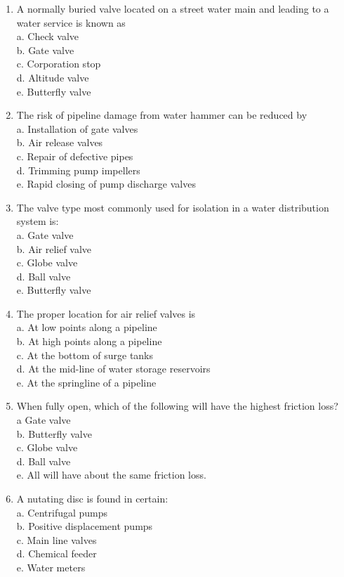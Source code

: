 \begin{enumerate}[1.]
\item A normally buried valve located on a street water main and leading to a water service is known as\\
a.	Check valve\\
b.	Gate valve \\
c.	Corporation stop\\
d.	Altitude valve\\
e.	Butterfly valve

\item The risk of pipeline damage from water hammer can be reduced by\\ 
a.	Installation of gate valves\\
b.	Air release valves\\
c.	Repair of defective pipes\\
d.	Trimming pump impellers\\
e.	Rapid closing of pump discharge valves

\item The valve type most commonly used for isolation in a water distribution system is:\\
a.	Gate valve\\
b.	Air relief valve\\
c.	Globe valve\\
d.	Ball valve\\
e.	Butterfly valve

\item The proper location for air relief valves is\\
a.	At low points along a pipeline\\
b.	At high points along a pipeline\\
c.	At the bottom of surge tanks\\
d.	At the mid-line of water storage reservoirs\\
e.	At the springline of a pipeline

\item When fully open, which of the following will have the highest friction loss?\\
a	Gate valve\\
b.	Butterfly valve\\
c.	Globe valve\\
d.	Ball valve\\
e.	All will have about the same friction loss.\\

\item A nutating disc is found in certain:\\
a.	Centrifugal pumps\\
b.	Positive displacement pumps\\
c.	Main line valves\\
d.	Chemical feeder\\
e.	Water meters\\


\end{enumerate}
